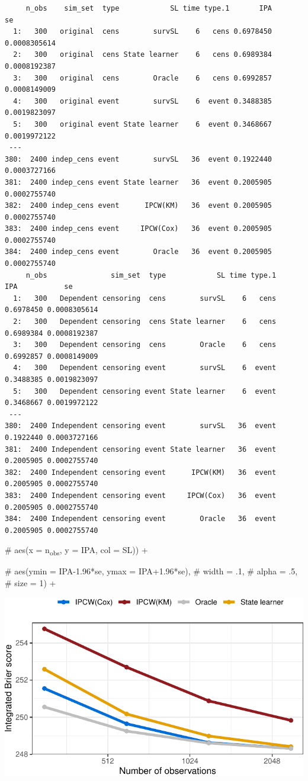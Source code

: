 \documentclass[11pt]{article}
\begin{document}
\begin{verbatim}
     n_obs    sim_set  type            SL time type.1       IPA           se
  1:   300   original  cens        survSL    6   cens 0.6978450 0.0008305614
  2:   300   original  cens State learner    6   cens 0.6989384 0.0008192387
  3:   300   original  cens        Oracle    6   cens 0.6992857 0.0008149009
  4:   300   original event        survSL    6  event 0.3488385 0.0019823097
  5:   300   original event State learner    6  event 0.3468667 0.0019972122
 ---                                                                        
380:  2400 indep_cens event        survSL   36  event 0.1922440 0.0003727166
381:  2400 indep_cens event State learner   36  event 0.2005905 0.0002755740
382:  2400 indep_cens event      IPCW(KM)   36  event 0.2005905 0.0002755740
383:  2400 indep_cens event     IPCW(Cox)   36  event 0.2005905 0.0002755740
384:  2400 indep_cens event        Oracle   36  event 0.2005905 0.0002755740
     n_obs               sim_set  type            SL time type.1       IPA           se
  1:   300   Dependent censoring  cens        survSL    6   cens 0.6978450 0.0008305614
  2:   300   Dependent censoring  cens State learner    6   cens 0.6989384 0.0008192387
  3:   300   Dependent censoring  cens        Oracle    6   cens 0.6992857 0.0008149009
  4:   300   Dependent censoring event        survSL    6  event 0.3488385 0.0019823097
  5:   300   Dependent censoring event State learner    6  event 0.3468667 0.0019972122
 ---                                                                                   
380:  2400 Independent censoring event        survSL   36  event 0.1922440 0.0003727166
381:  2400 Independent censoring event State learner   36  event 0.2005905 0.0002755740
382:  2400 Independent censoring event      IPCW(KM)   36  event 0.2005905 0.0002755740
383:  2400 Independent censoring event     IPCW(Cox)   36  event 0.2005905 0.0002755740
384:  2400 Independent censoring event        Oracle   36  event 0.2005905 0.0002755740
\end{verbatim}

\#	 aes(x = n\textsubscript{obs}, y = IPA, col = SL)) +

\#		  aes(ymin = IPA-1.96*se, ymax = IPA+1.96*se),
\#		  width = .1,
\#		  alpha = .5,
\#		  size = 1) + 

\begin{center}
\includegraphics[width=.9\linewidth]{experiment-fig-sl-ipcw.pdf}
\end{center}
\end{document}
